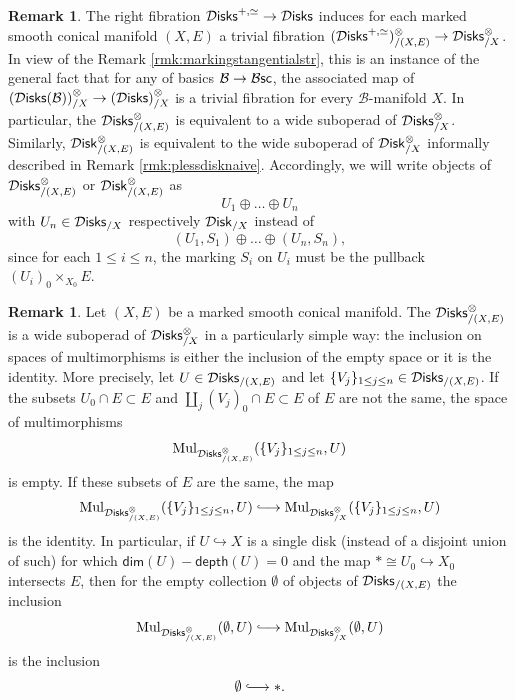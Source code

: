 \documentclass[10pt, reqno, twoside
, final
]{amsart}
\numberwithin{equation}{subsection}%
\theoremstyle{definition}
\theoremstyle{definition}
\theoremstyle{definition}
\theoremstyle{definition}
\theoremstyle{definition}
\theoremstyle{definition}
\theoremstyle{definition}
\theoremstyle{definition}
\theoremstyle{definition}
\theoremstyle{plain}
\theoremstyle{definition}
\theoremstyle{plain}
\theoremstyle{definition}
\theoremstyle{plain}
\theoremstyle{definition}
\newtheorem{rmk}[defn]{Remark}
\theoremstyle{definition}
\theoremstyle{plain}
\theoremstyle{plain}
\theoremstyle{definition}
\theoremstyle{plain}
\theoremstyle{plain}
\theoremstyle{plain}
\begin{document}
\begin{rmk}
The right fibration $\mathcal{D}\mathsf{isks}^{+,\simeq}\rightarrow \mathcal{D}\mathsf{isks}$ induces for each marked smooth conical manifold $(X,E)$ a trivial fibration $(\mathcal{D}\mathsf{isks}^{+,\simeq})^{\otimes}_{/(X,E)}\rightarrow \mathcal{D}\mathsf{isks}^{\otimes}_{/X}$. In view of the Remark \ref{rmk:markingstangentialstr}, this is an instance of the general fact that for any \infcat of basics $\mathcal{B}\rightarrow \mathcal{B}\mathsf{sc}$, the associated map of \infops $\left(\mathcal{D}\mathsf{isks}(\mathcal{B})\right)^{\otimes}_{/X}\rightarrow \left(\mathcal{D}\mathsf{isks}\right)^{\otimes}_{/X}$ is a trivial fibration for every $\mathcal{B}$-manifold $X$. In particular, the \infop $\mathcal{D}\mathsf{isks}^{\otimes}_{/(X,E)}$ is equivalent to a wide suboperad of $\mathcal{D}\mathsf{isks}^{\otimes}_{/X}$. Similarly, $\mathcal{D}\mathsf{isk}^{\otimes}_{/(X,E)}$ is equivalent to the wide suboperad of $\mathcal{D}\mathsf{isk}^{\otimes}_{/X}$ informally described in Remark \ref{rmk:plessdisknaive}. Accordingly, we will write objects of $\mathcal{D}\mathsf{isks}^{\otimes}_{/(X,E)}$ or $\mathcal{D}\mathsf{isk}^{\otimes}_{/(X,E)}$ as 
\[ U_1\oplus \ldots\oplus U_n\] with $U_n\in \mathcal{D}\mathsf{isks}_{/X}$ respectively $\mathcal{D}\mathsf{isk}_{/X}$ instead of
\[(U_1,S_1)\oplus \ldots \oplus(U_n,S_n),\] 
since for each $1 \leq i\leq n$, the marking $S_i$ on $U_i$ must be the pullback $(U_i)_0\times_{X_0}E$.
\end{rmk}

\begin{rmk}\label{rmk:suboperad}
Let $(X,E)$ be a marked smooth conical manifold. The \infop $\mathcal{D}\mathsf{isks}^{\otimes}_{/(X,E)}$ is a wide suboperad of $ \mathcal{D}\mathsf{isks}^{\otimes}_{/X}$ in a particularly simple way: the inclusion on spaces of multimorphisms is either the inclusion of the empty space or it is the identity. More precisely, let $U\in\mathcal{D}\mathsf{isks}_{/(X,E)}$ and let $\{V_j\}_{1\leq j\leq n}\in \mathcal{D}\mathsf{isks}_{/(X,E)}$. If the subsets $U_0\cap E\subset E$ and $\coprod_j (V_j)_0 \cap E\subset E$ of $E$ are not the same, the space of multimorphisms 
\[  \mathrm{Mul}_{\mathcal{D}\mathsf{isks}^{\otimes}_{/(X,E)}}(\{V_j\}_{1\leq j\leq n},U) \]
is empty. If these subsets of $E$ are the same, the map 
\[  \mathrm{Mul}_{\infdisks^{\otimes}_{/(X,E)}}(\{V_j\}_{1\leq j\leq n},U) \hooklongrightarrow \mathrm{Mul}_{\infdisks^{\otimes}_{/X}}(\{V_j\}_{1\leq j\leq n},U) \]
is the identity. In particular, if $U\hookrightarrow X$ is a single disk (instead of a disjoint union of such) for which $\mathsf{dim}(U)-\mathsf{depth}(U)=0$ and the map $*\cong U_0\hookrightarrow X_0$ intersects $E$, then for the empty collection $\emptyset$ of objects of $\mathcal{D}\mathsf{isks}_{/(X,E)}$ the inclusion 
\[  \mathrm{Mul}_{\infdisks^{\otimes}_{/(X,E)}}(\emptyset,U) \hooklongrightarrow \mathrm{Mul}_{\infdisks^{\otimes}_{/X}}(\emptyset,U) \]
is the inclusion 
\[ \emptyset \hooklongrightarrow *. \]
\end{rmk}
\end{document}
